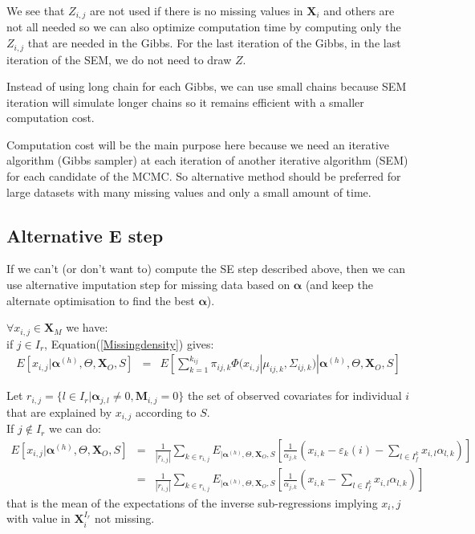 \documentclass[11pt,a4paper]{report}
\begin{document}
	
	
	We see that $Z_{i,j}$ are not used if there is no missing values in $\boldsymbol{X}_i$ and others are not all needed so we can also optimize computation time by  computing only the $Z_{i,j}$ that are needed in the Gibbs.
	For the last iteration of the Gibbs, in the last iteration of the SEM, we do not need to draw $Z$.	
	
	Instead of using long chain for each Gibbs, we can use small chains because SEM iteration will simulate longer chains so it remains efficient with a smaller computation cost.
	
	Computation cost will be the main purpose here because we need an iterative algorithm (Gibbs sampler) at each iteration of another iterative algorithm (SEM) for each candidate of the MCMC.
	So alternative method should be preferred for large datasets with many missing values and only a small amount of time.
			
\subsection{Alternative E step}
	If we can't (or don't want to) compute the SE step described above, then we can use alternative imputation step for missing data based on $\boldsymbol{\alpha}$ (and keep the alternate optimisation to find the best $\boldsymbol{\alpha}$). 
	
	$\forall x_{i,j} \in \boldsymbol{X}_M $ we have:
	\\
if $j\in I_r$, Equation(\ref{Missingdensity}) gives: 
	\begin{eqnarray}
	E[x_{i,j}|\boldsymbol{\alpha}^{(h)},\Theta,\boldsymbol{X}_O,S]&=&E[\sum_{k=1}^{k_{ij}}\pi_{ij,k}\Phi(x_{i,j}|\mu_{ij,k},\Sigma_{ij,k})|\boldsymbol{\alpha}^{(h)},\Theta,\boldsymbol{X}_O,S] 
	\end{eqnarray}
	  
	Let $r_{i,j}=\{l \in I_r| \boldsymbol{\alpha}_{j,l}\neq 0, \boldsymbol{M}_{i,j}=0 \}$ the set of observed covariates for individual $i$ that are explained by $x_{i,j}$ according to $S$.
	\\
	If $j\notin I_r$ we can do:
	\begin{eqnarray}
	E[x_{i,j}|\boldsymbol{\alpha}^{(h)},\Theta,\boldsymbol{X}_O,S]&=&\frac{1}{|r_{i,j}|}\sum_{k \in r_{i,j}}E_{|\boldsymbol{\alpha}^{(h)},\Theta,\boldsymbol{X}_O,S}\left[\frac{1}{\alpha_{j,k}}\left(x_{i,k}-\varepsilon_{k}(i)-\sum_{l \in I_f^k} x_{i,l}\alpha_{l,k}\right)\right] \\
	&=& \frac{1}{|r_{i,j}|}\sum_{k \in r_{i,j}}E_{|\boldsymbol{\alpha}^{(h)},\Theta,\boldsymbol{X}_O,S}\left[\frac{1}{\alpha_{j,k}}\left(x_{i,k}- \sum_{l \in I_f^k} x_{i,l}\alpha_{l,k}\right)\right]
	\end{eqnarray}
	that is the mean of the expectations of the inverse sub-regressions implying $x_i,j$ with value in $\boldsymbol{X}^{I_r}_i$ not missing.
\end{document}
